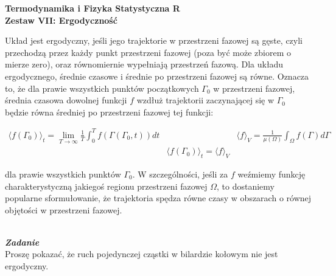 \documentclass[11pt,a4paper]{article}
\newcounter{zadanie}\newcommand{\zadanie}[1][]{\addtocounter{zadanie}{1} ~\\  {\bf \emph{Zadanie \arabic{zadanie} #1 }} \\}
\begin{document}
   

\begin{centering}
  {\bf {\Large
  Termodynamika i Fizyka Statystyczna R \\
  Zestaw VII: Ergodyczność
  }} \\  
\end{centering}

\vspace{1cm}

Układ jest ergodyczny, jeśli jego trajektorie w przestrzeni fazowej są gęste, 
czyli przechodzą przez każdy punkt przestrzeni fazowej 
(poza być może zbiorem o mierze zero), oraz równomiernie wypełniają przestrzeń fazową.
Dla układu ergodycznego, 
średnie czasowe i średnie po przestrzeni fazowej są równe. Oznacza to, 
że dla prawie wszystkich punktów początkowych $\Gamma_0$ w przestrzeni fazowej, 
średnia czasowa dowolnej funkcji $f$ wzdłuż trajektorii zaczynającej się 
w $\Gamma_0$ będzie równa średniej po przestrzeni fazowej tej funkcji:

\begin{align*}
\langle f(\Gamma_0)\rangle_t = \lim_{T \to \infty} \frac{1}{T}\int_0^T f(\Gamma(\Gamma_0, t))dt
& &
\langle f \rangle_V = \frac{1}{\mu(\Omega)}\int_\Omega f(\Gamma)d\Gamma \\
& 
\langle f(\Gamma_0)\rangle_t = \langle f \rangle_V
\end{align*}

dla prawie wszystkich punktów $\Gamma_0$. W szczególności, jeśli 
za $f$ weźmiemy funkcję charakterystyczną jakiegoś regionu przestrzeni 
fazowej $\Omega$, to dostaniemy popularne sformułowanie, że trajektoria 
spędza równe czasy w obszarach o równej objętości w przestrzeni fazowej.
\vspace{1cm}
\zadanie[]

Proszę pokazać, że ruch pojedynczej cząstki w bilardzie kołowym nie 
jest ergodyczny.
\end{document}
